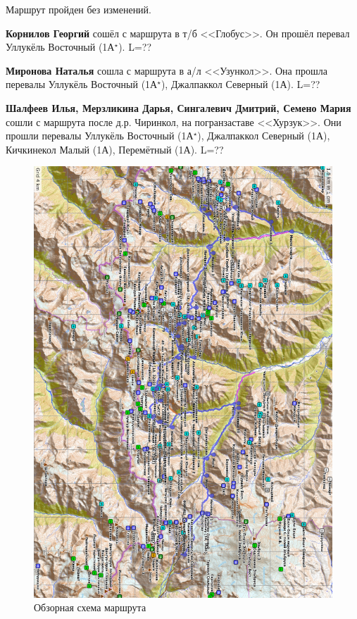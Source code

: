 Маршрут пройден без изменений.

\textbf{Корнилов Георгий} сошёл с маршрута в т/б <<Глобус>>. Он прошёл перевал Уллукёль Восточный (1А$^{\star}$). \alert{L=??}

\textbf{Миронова Наталья} сошла с маршрута в а/л <<Узункол>>. Она прошла перевалы Уллукёль Восточный (1А$^{\star}$), Джалпаккол Северный (1А). \alert{L=??}

\textbf{Шалфеев Илья, Мерзликина Дарья, Сингалевич Дмитрий, Семено Мария} сошли с маршрута после д.р. Чиринкол, на погранзаставе <<Хурзук>>. Они прошли перевалы Уллукёль Восточный (1А$^{\star}$), Джалпаккол Северный (1А), Кичкинекол Малый (1А), Перемётный (1А). \alert{L=??}

\begin{figure}
	\centering
	\includegraphics[width=0.92\linewidth]{../pics/map}
	\caption{Обзорная схема маршрута}
\end{figure}
	


